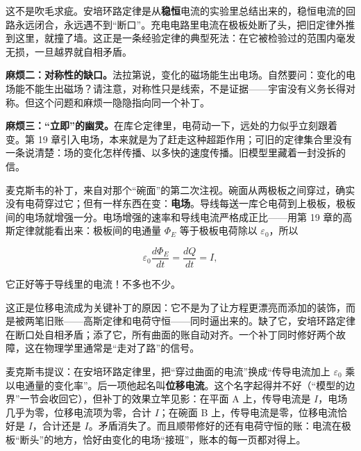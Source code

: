 \begin{center}
\end{center}

这不是吹毛求疵。安培环路定律是从\textbf{稳恒}电流的实验里总结出来的，稳恒电流的回路永远闭合，永远遇不到“断口”。充电电路里电流在极板处断了头，把旧定律外推到这里，就撞了墙。这正是一条经验定律的典型死法：在它被检验过的范围内毫发无损，一旦越界就自相矛盾。

\textbf{麻烦二：对称性的缺口。}法拉第说，变化的磁场能生出电场。自然要问：变化的电场能不能生出磁场？请注意，对称性只是线索，不是证据——宇宙没有义务长得对称。但这个问题和麻烦一隐隐指向同一个补丁。

\textbf{麻烦三：“立即”的幽灵。}在库仑定律里，电荷动一下，远处的力似乎立刻跟着变。第 19 章引入电场，本来就是为了赶走这种超距作用；可旧的定律集合里没有一条说清楚：场的变化怎样传播、以多快的速度传播。旧模型里藏着一封没拆的信。


麦克斯韦的补丁，来自对那个“碗面”的第二次注视。碗面从两极板之间穿过，确实没有电荷穿过它；但有一样东西在变：\textbf{电场}。导线每送一库仑电荷到上极板，极板间的电场就增强一分。电场增强的速率和导线电流严格成正比——用第 19 章的高斯定律就能看出来：极板间的电通量 \(\varPhi_E\) 等于极板电荷除以 \(\varepsilon_0\)，所以

\[
\varepsilon_0\frac{d\varPhi_E}{dt}=\frac{dQ}{dt}=I,
\]

它正好等于导线里的电流！不多也不少。

这正是位移电流成为关键补丁的原因：它不是为了让方程更漂亮而添加的装饰，而是被两笔旧账——高斯定律和电荷守恒——同时逼出来的。缺了它，安培环路定律在断口处自相矛盾；添了它，所有曲面的账自动对齐。一个补丁同时修好两个故障，这在物理学里通常是“走对了路”的信号。

麦克斯韦提议：在安培环路定律里，把“穿过曲面的电流”换成“传导电流加上 \(\varepsilon_0\) 乘以电通量的变化率”。后一项他起名叫\textbf{位移电流}。这个名字起得并不好（“模型的边界”一节会收回它），但补丁的效果立竿见影：在平面 A 上，传导电流是 \(I\)，电场几乎为零，位移电流项为零，合计 \(I\)；在碗面 B 上，传导电流是零，位移电流恰好是 \(I\)，合计还是 \(I\)。矛盾消失了。而且顺带修好的还有电荷守恒的账：电流在极板“断头”的地方，恰好由变化的电场“接班”，账本的每一页都对得上。

